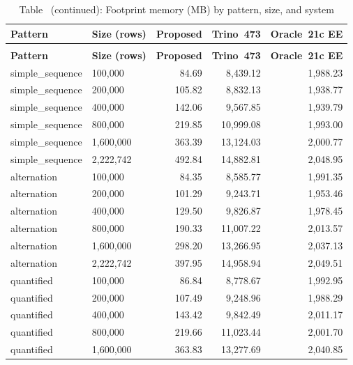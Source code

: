 {\scriptsize
\setlength{\tabcolsep}{3pt}
\begin{longtable}{>{\ttfamily}llrrr}
\caption{Absolute footprint memory by pattern, size, and system (MB)}
\label{tab:memory_footprint} \\
\toprule
\textbf{Pattern} & \textbf{Size (rows)} & \textbf{Proposed} & \textbf{Trino~473} & \textbf{Oracle~21c EE} \\
\midrule
\endfirsthead
\caption*{Table~\thetable{} (continued): Footprint memory (MB) by pattern, size, and system} \\
\toprule
\textbf{Pattern} & \textbf{Size (rows)} & \textbf{Proposed} & \textbf{Trino~473} & \textbf{Oracle~21c EE} \\
\midrule
\endhead
\bottomrule
\endfoot
simple\_sequence & 100{,}000 & 84.69 & 8{,}439.12 & 1{,}988.23 \\
simple\_sequence & 200{,}000 & 105.82 & 8{,}832.13 & 1{,}938.77 \\
simple\_sequence & 400{,}000 & 142.06 & 9{,}567.85 & 1{,}939.79 \\
simple\_sequence & 800{,}000 & 219.85 & 10{,}999.08 & 1{,}993.00 \\
simple\_sequence & 1{,}600{,}000 & 363.39 & 13{,}124.03 & 2{,}000.77 \\
simple\_sequence & 2{,}222{,}742 & 492.84 & 14{,}882.81 & 2{,}048.95 \\
\midrule
alternation & 100{,}000 & 84.35 & 8{,}585.77 & 1{,}991.35 \\
alternation & 200{,}000 & 101.29 & 9{,}243.71 & 1{,}953.46 \\
alternation & 400{,}000 & 129.50 & 9{,}826.87 & 1{,}978.45 \\
alternation & 800{,}000 & 190.33 & 11{,}007.22 & 2{,}013.57 \\
alternation & 1{,}600{,}000 & 298.20 & 13{,}266.95 & 2{,}037.13 \\
alternation & 2{,}222{,}742 & 397.95 & 14{,}958.94 & 2{,}049.51 \\
\midrule
quantified & 100{,}000 & 86.84 & 8{,}778.67 & 1{,}992.95 \\
quantified & 200{,}000 & 107.49 & 9{,}248.96 & 1{,}988.29 \\
quantified & 400{,}000 & 143.42 & 9{,}842.49 & 2{,}011.17 \\
quantified & 800{,}000 & 219.66 & 11{,}023.44 & 2{,}001.70 \\
quantified & 1{,}600{,}000 & 363.83 & 13{,}277.69 & 2{,}040.85 \\

\end{longtable}}
